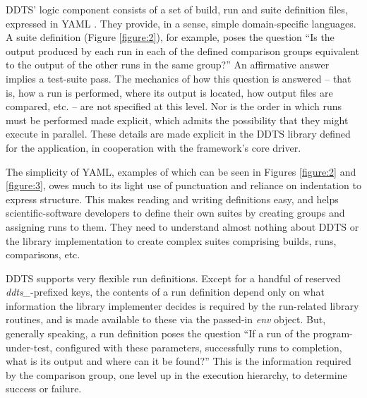 \documentclass[conference]{IEEEtran}
\begin{document}
DDTS' logic component consists of a set of build, run and suite definition files, expressed in YAML \cite{yaml}. They provide, in a sense, simple domain-specific languages. A suite definition (Figure \ref{figure:2}), for example, poses the question ``Is the output produced by each run in each of the defined comparison groups equivalent to the output of the other runs in the same group?'' An affirmative answer implies a test-suite pass. The mechanics of how this question is answered -- that is, how a run is performed, where its output is located, how output files are compared, etc. -- are not specified at this level. Nor is the order in which runs must be performed made explicit, which admits the possibility that they might execute in parallel. These details are made explicit in the DDTS library defined for the application, in cooperation with the framework's core driver.

The simplicity of YAML, examples of which can be seen in Figures \ref{figure:2} and \ref{figure:3}, owes much to its light use of punctuation and reliance on indentation to express structure. This makes reading and writing definitions easy, and helps scientific-software developers to define their own suites by creating groups and assigning runs to them. They need to understand almost nothing about DDTS or the library implementation to create complex suites comprising builds, runs, comparisons, etc.

DDTS supports very flexible run definitions. Except for a handful of reserved \emph{ddts\_}-prefixed keys, the contents of a run definition depend only on what information the library implementer decides is required by the run-related library routines, and is made available to these via the passed-in \emph{env} object. But, generally speaking, a run definition poses the question ``If a run of the program-under-test, configured with these parameters, successfully runs to completion, what is its output and where can it be found?'' This is the information required by the comparison group, one level up in the execution hierarchy, to determine success or failure.
\end{document}
